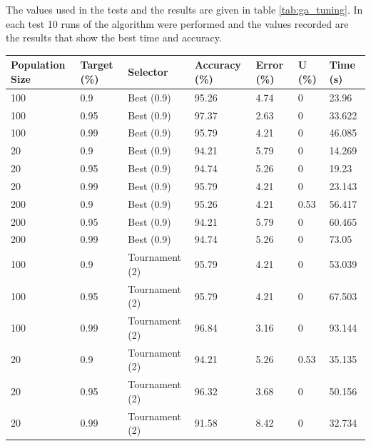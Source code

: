 \documentclass[a4paper]{article}
\begin{document}
The values used in the tests and the results are given in table
\ref{tab:ga_tuning}. In each test 10 runs of the algorithm were performed and
the values recorded are the results that show the best time and accuracy.

\begin{table}[h!]
  \centering
  \begin{tabular}{@{}lllllll@{}}
    \toprule
    Population Size & Target (\%) & Selector       & Accuracy (\%) & Error (\%) & U (\%) & Time (s) \\
    \midrule
    100             & 0.9         & Best (0.9)     & 95.26         & 4.74       & 0      & 23.96    \\
    100             & 0.95        & Best (0.9)     & 97.37         & 2.63       & 0      & 33.622   \\
    100             & 0.99        & Best (0.9)     & 95.79         & 4.21       & 0      & 46.085   \\
    20              & 0.9         & Best (0.9)     & 94.21         & 5.79       & 0      & 14.269   \\
    20              & 0.95        & Best (0.9)     & 94.74         & 5.26       & 0      & 19.23    \\
    20              & 0.99        & Best (0.9)     & 95.79         & 4.21       & 0      & 23.143   \\
    200             & 0.9         & Best (0.9)     & 95.26         & 4.21       & 0.53   & 56.417   \\
    200             & 0.95        & Best (0.9)     & 94.21         & 5.79       & 0      & 60.465   \\
    200             & 0.99        & Best (0.9)     & 94.74         & 5.26       & 0      & 73.05    \\
    100             & 0.9         & Tournament (2) & 95.79         & 4.21       & 0      & 53.039   \\
    100             & 0.95        & Tournament (2) & 95.79         & 4.21       & 0      & 67.503   \\
    100             & 0.99        & Tournament (2) & 96.84         & 3.16       & 0      & 93.144   \\
    20              & 0.9         & Tournament (2) & 94.21         & 5.26       & 0.53   & 35.135   \\
    20              & 0.95        & Tournament (2) & 96.32         & 3.68       & 0      & 50.156   \\
    20              & 0.99        & Tournament (2) & 91.58         & 8.42       & 0      & 32.734   \\

\end{tabular}
\end{table}
\end{document}
